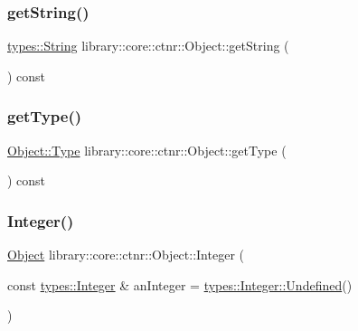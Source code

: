 \mbox{\label{classlibrary_1_1core_1_1ctnr_1_1_object_a305c8e17d048a835fe453ed54a6c1a43}} 
\subsubsection{\texorpdfstring{get\+String()}{getString()}}
{\footnotesize\ttfamily \hyperlink{classlibrary_1_1core_1_1types_1_1_string}{types\+::\+String} library\+::core\+::ctnr\+::\+Object\+::get\+String (\begin{DoxyParamCaption}{ }\end{DoxyParamCaption}) const}

\mbox{\label{classlibrary_1_1core_1_1ctnr_1_1_object_aa2cc92ae24eb576e0f06af4dce8b7151}} 
\subsubsection{\texorpdfstring{get\+Type()}{getType()}}
{\footnotesize\ttfamily \hyperlink{classlibrary_1_1core_1_1ctnr_1_1_object_a0766006ad111133d70349019551b31d6}{Object\+::\+Type} library\+::core\+::ctnr\+::\+Object\+::get\+Type (\begin{DoxyParamCaption}{ }\end{DoxyParamCaption}) const}

\mbox{\label{classlibrary_1_1core_1_1ctnr_1_1_object_a8a8b1ef718d092c154011cf5c37373bb}} 
\subsubsection{\texorpdfstring{Integer()}{Integer()}}
{\footnotesize\ttfamily \hyperlink{classlibrary_1_1core_1_1ctnr_1_1_object}{Object} library\+::core\+::ctnr\+::\+Object\+::\+Integer (\begin{DoxyParamCaption}\item[{const \hyperlink{classlibrary_1_1core_1_1types_1_1_integer}{types\+::\+Integer} \&}]{an\+Integer = {\ttfamily \hyperlink{classlibrary_1_1core_1_1types_1_1_integer_a142c2df49031b787daf30673c73fcad7}{types\+::\+Integer\+::\+Undefined}()} }\end{DoxyParamCaption})\hspace{0.3cm}{\ttfamily [static]}}

